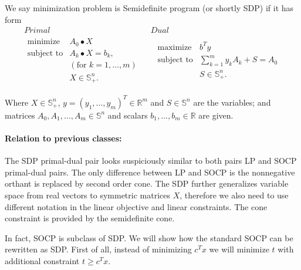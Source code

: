 \documentclass[10pt,oneside]{book}
\theoremstyle{definition}
\begin{document}
\label{defSDP}
We say minimization problem is Semidefinite program (or shortly SDP) if it has form
\begin{equation}
\label{sdp} 
\begin{array}{c|c}
Primal & Dual \\
\begin{array}{ll}
\mbox{minimize} & A_0\bullet X \\
\mbox{subject to}& A_k\bullet X  = b_k, \ \\
 & (\mbox{for } k = 1,\dots ,m) \\
& X \in \mathbb{S}^n_+.
\end{array}
\ \  &  \ \
\begin{array}{ll}
\mbox{maximize} & b^Ty \\
\mbox{subject to}& \sum_{k=1}^m y_kA_k + S  = A_0 \\
& S \in \mathbb{S}^n_+.
\end{array}
\end{array}
 \tag{SDP}
\end{equation}

Where $X\in \mathbb{S}^n_+$, $y = (y_1,\dots ,y_m)^T\in \mathbb{R}^m$ and $S\in \mathbb{S}^n$ are the variables; and matrices $A_0 , A_1,\dots , A_m \in \mathbb{S}^n$ and scalars $b_1,\dots, b_m \in \mathbb{R}$ are given.




\paragraph{Relation to previous classes:}
The  SDP primal-dual pair looks suspiciously similar to both pairs LP and SOCP primal-dual pairs. 
The only difference between LP and SOCP is the nonnegative orthant is replaced by second order cone. 
The SDP further generalizes variable space from real vectors to symmetric matrices $X$, 
therefore we also need to use different notation in the linear objective and linear constraints. 
The cone constraint is provided by the semidefinite cone.

In fact, SOCP is subclass of SDP. We will show how the standard SOCP can be rewritten as SDP.
First of all, instead of minimizing $c^Tx$ we will minimize $t$ with additional constraint $t\geq c^Tx$. 
\end{document}
